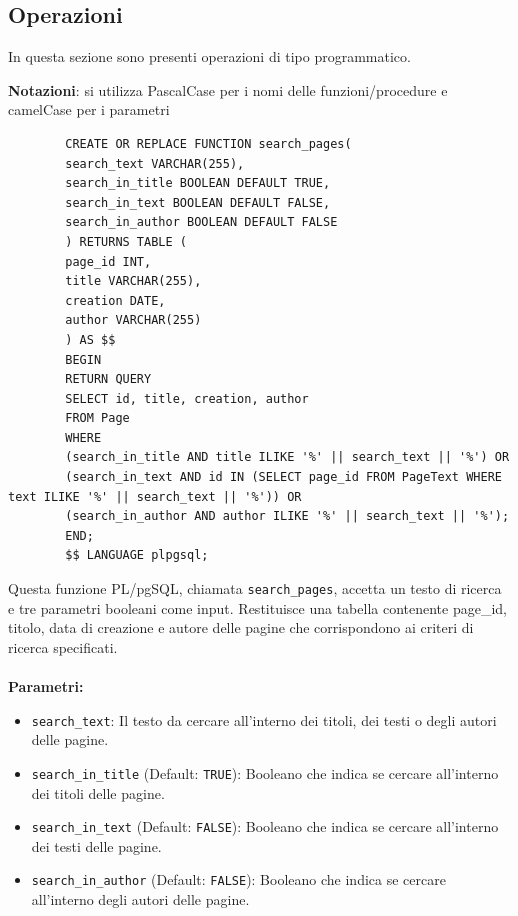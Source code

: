 \documentclass{article}
\begin{document}
	\newpage

	\subsection{Operazioni}
	In questa sezione sono presenti operazioni di tipo programmatico.
	
	\textbf{Notazioni}: si utilizza PascalCase per i nomi delle funzioni/procedure e
	camelCase per i parametri
	
	\begin{lstlisting}
		CREATE OR REPLACE FUNCTION search_pages(
		search_text VARCHAR(255),
		search_in_title BOOLEAN DEFAULT TRUE,
		search_in_text BOOLEAN DEFAULT FALSE,
		search_in_author BOOLEAN DEFAULT FALSE
		) RETURNS TABLE (
		page_id INT,
		title VARCHAR(255),
		creation DATE,
		author VARCHAR(255)
		) AS $$
		BEGIN
		RETURN QUERY
		SELECT id, title, creation, author
		FROM Page
		WHERE
		(search_in_title AND title ILIKE '%' || search_text || '%') OR
		(search_in_text AND id IN (SELECT page_id FROM PageText WHERE text ILIKE '%' || search_text || '%')) OR
		(search_in_author AND author ILIKE '%' || search_text || '%');
		END;
		$$ LANGUAGE plpgsql;
	\end{lstlisting}
	
	
	
	Questa funzione PL/pgSQL, chiamata \texttt{search\_pages}, accetta un testo di ricerca e tre parametri booleani come input. Restituisce una tabella contenente page\_id, titolo, data di creazione e autore delle pagine che corrispondono ai criteri di ricerca specificati. \\\\
	
	\textbf{Parametri:}\\	
	\begin{itemize}
		\item \texttt{search\_text}: Il testo da cercare all'interno dei titoli, dei testi o degli autori delle pagine.
		\item \texttt{search\_in\_title} (Default: \texttt{TRUE}): Booleano che indica se cercare all'interno dei titoli delle pagine.
		\item \texttt{search\_in\_text} (Default: \texttt{FALSE}): Booleano che indica se cercare all'interno dei testi delle pagine.
		\item \texttt{search\_in\_author} (Default: \texttt{FALSE}): Booleano che indica se cercare all'interno degli autori delle pagine.
	\end{itemize}
	
\end{document}
